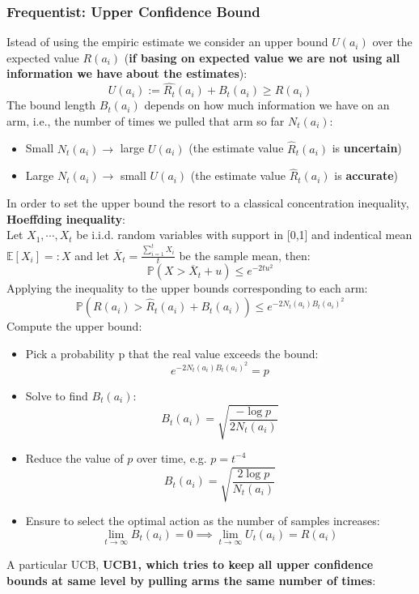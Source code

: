 \subsubsection{Frequentist: Upper Confidence Bound}
    Istead of using the empiric estimate we consider an upper bound $U(a_i)$ over the expected value $R(a_i)$ (\textbf{if basing on expected value we are not using all information we have about the estimates}):
    $$U(a_i):=\hat{R_t}(a_i)+B_t(a_i)\geq R(a_i)$$
    The bound length $B_t(a_i)$ depends on how much information we have on an arm, i.e., the number of times we pulled that arm so far $N_t(a_i)$:
    \begin{itemize}
        \item Small $N_t(a_i)\rightarrow$ large $U(a_i)$ (the estimate value $\hat{R}_t(a_i)$ is \textbf{uncertain})
        \item Large $N_t(a_i)\rightarrow$ small $U(a_i)$ (the estimate value $\hat{R}_t(a_i)$ is \textbf{accurate})
    \end{itemize}
    In order to set the upper bound the resort to a classical concentration inequality, \textbf{Hoeffding inequality}:\\
    Let $X_1,\cdots,X_t$ be i.i.d. random variables with support in [0,1] and indentical mean $\mathbb{E}[X_i]=:X$ and let $\overline{X}_t=\frac{\sum_{i=1}^tX_i}{t}$ be the sample mean, then:
    $$\mathbb{P}(X>\overline{X}_t+u)\leq e^{-2tu^2}$$
    Applying the inequality to the upper bounds corresponding to each arm:
    $$\mathbb{P}\left(R(a_i)>\hat{R}_t(a_i)+B_t(a_i)\right)\leq e^{-2N_t(a_i)B_t(a_i)^2}$$
    Compute the upper bound:
    \begin{itemize}
        \item Pick a probability p that the real value exceeds the bound:
        $$e^{-2N_t(a_i)B_t(a_i)^2}=p$$
        \item Solve to find $B_t(a_i)$:
        $$B_t(a_i)=\sqrt{\frac{-\log p}{2N_t(a_i)}}$$
        \item Reduce the value of $p$ over time, e.g. $p=t^{-4}$
        $$B_t(a_i)=\sqrt{\frac{2\log p}{N_t(a_i)}}$$
        \item Ensure to select the optimal action as the number of samples increases:
        $$\lim_{t\rightarrow\infty}B_t(a_i)=0\implies \lim_{t\rightarrow\infty}U_t(a_i)=R(a_i)$$
    \end{itemize}
    A particular UCB, \textbf{UCB1, which tries to keep all upper confidence bounds at same level by pulling arms the same number of times}:
